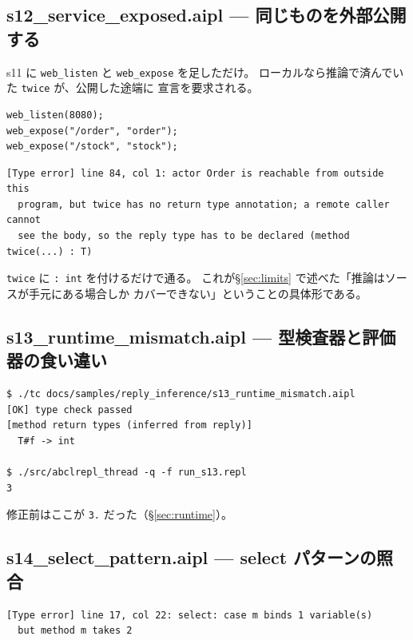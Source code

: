 \documentclass[11pt,a4paper]{ltjsarticle}
\theoremstyle{definition}
\theoremstyle{remark}
\begin{document}
\subsection{s12\_service\_exposed.aipl --- 同じものを外部公開する}

s11 に \texttt{web\_listen} と \texttt{web\_expose} を足しただけ。
ローカルなら推論で済んでいた \texttt{twice} が、公開した途端に
宣言を要求される。

\begin{lstlisting}[language=AIPL]
web_listen(8080);
web_expose("/order", "order");
web_expose("/stock", "stock");
\end{lstlisting}

\begin{lstlisting}[language={}]
[Type error] line 84, col 1: actor Order is reachable from outside this
  program, but twice has no return type annotation; a remote caller cannot
  see the body, so the reply type has to be declared (method twice(...) : T)
\end{lstlisting}

\texttt{twice} に \texttt{: int} を付けるだけで通る。
これが\S\ref{sec:limits} で述べた「推論はソースが手元にある場合しか
カバーできない」ということの具体形である。

\subsection{s13\_runtime\_mismatch.aipl --- 型検査器と評価器の食い違い}



\begin{lstlisting}[language={}]
$ ./tc docs/samples/reply_inference/s13_runtime_mismatch.aipl
[OK] type check passed
[method return types (inferred from reply)]
  T#f -> int

$ ./src/abclrepl_thread -q -f run_s13.repl
3
\end{lstlisting}

修正前はここが \texttt{3.} だった（\S\ref{sec:runtime}）。

\subsection{s14\_select\_pattern.aipl --- select パターンの照合}



\begin{lstlisting}[language={}]
[Type error] line 17, col 22: select: case m binds 1 variable(s)
  but method m takes 2
\end{lstlisting}
\end{document}
